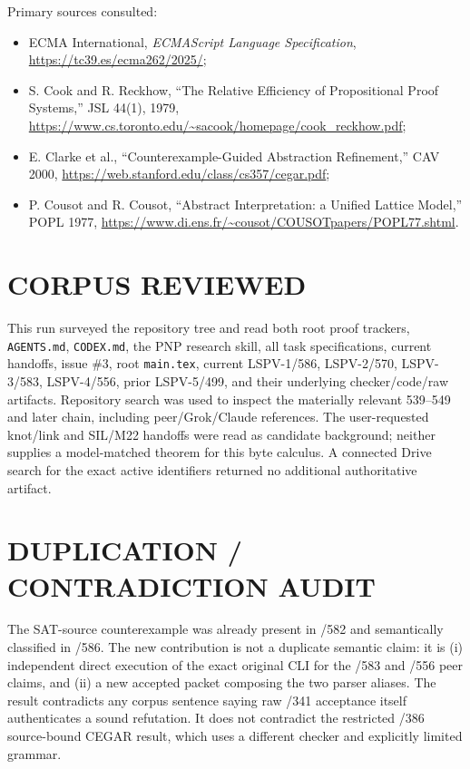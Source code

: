 \documentclass[11pt]{article}
\begin{document}
Primary sources consulted:
\begin{itemize}
\item ECMA International, \emph{ECMAScript Language Specification},
  \url{https://tc39.es/ecma262/2025/};
\item S. Cook and R. Reckhow, ``The Relative Efficiency of Propositional Proof
  Systems,'' JSL 44(1), 1979,
  \url{https://www.cs.toronto.edu/~sacook/homepage/cook_reckhow.pdf};
\item E. Clarke et al., ``Counterexample-Guided Abstraction Refinement,''
  CAV 2000, \url{https://web.stanford.edu/class/cs357/cegar.pdf};
\item P. Cousot and R. Cousot, ``Abstract Interpretation: a Unified Lattice
  Model,'' POPL 1977,
  \url{https://www.di.ens.fr/~cousot/COUSOTpapers/POPL77.shtml}.
\end{itemize}

\section{CORPUS REVIEWED}

This run surveyed the repository tree and read both root proof trackers,
\texttt{AGENTS.md}, \texttt{CODEX.md}, the PNP research skill, all task
specifications, current handoffs, issue \#3, root \texttt{main.tex}, current
LSPV-1/586, LSPV-2/570, LSPV-3/583, LSPV-4/556, prior LSPV-5/499, and their
underlying checker/code/raw artifacts.  Repository search was used to inspect
the materially relevant 539--549 and later chain, including peer/Grok/Claude
references.  The user-requested knot/link and SIL/M22 handoffs were read as
candidate background; neither supplies a model-matched theorem for this byte
calculus.  A connected Drive search for the exact active identifiers returned
no additional authoritative artifact.

\section{DUPLICATION / CONTRADICTION AUDIT}

The SAT-source counterexample was already present in /582 and semantically
classified in /586.  The new contribution is not a duplicate semantic claim:
it is (i) independent direct execution of the exact original CLI for the /583
and /556 peer claims, and (ii) a new accepted packet composing the two parser
aliases.  The result contradicts any corpus sentence saying raw /341
acceptance itself authenticates a sound refutation.  It does not contradict
the restricted /386 source-bound CEGAR result, which uses a different checker
and explicitly limited grammar.
\end{document}

